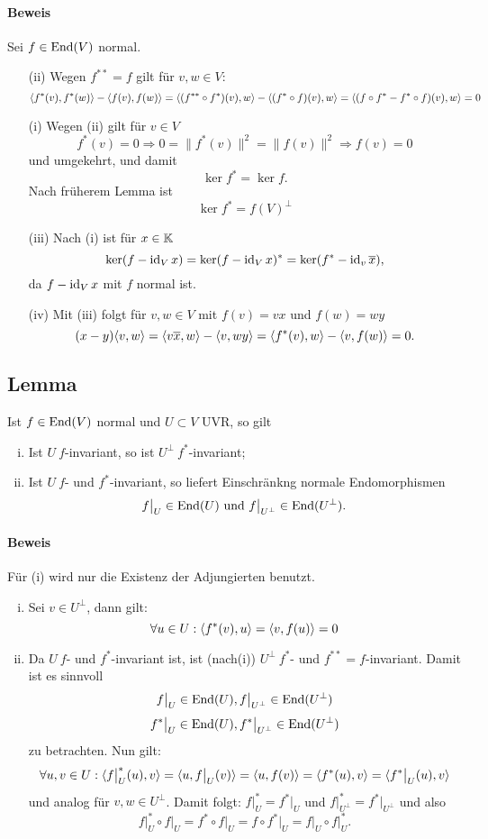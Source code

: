 \paragraph{Beweis}
	Sei $ f\in \operatorname{End}(V) $ normal.
		\begin{enumerate}
			\item[(ii)] Wegen $ f^{**} = f $ gilt für $ v,w\in V $:
				\[ \langle f^*(v),f^*(w) \rangle-\langle f(v),f(w) \rangle = \langle (f^{**}\circ f^*)(v),w \rangle-\langle (f^*\circ f)(v),w \rangle = \langle (f\circ f^*-f^*\circ f)(v),w \rangle = 0 \]
			\item[(i)] Wegen (ii) gilt für $ v\in V $
				\[ f^*(v) = 0 \Rightarrow 0 = \|f^*(v)\|^2 = \|f(v)\|^2\Rightarrow f(v) = 0 \]
				und umgekehrt, und damit
				\[ \ker f^* = \ker f. \]
				Nach früherem Lemma ist
					\[ \ker f^* = f(V)^\perp \]
			\item[(iii)] Nach (i) ist für $ x\in \mathbb{K} $
				\[ \ker(f-\operatorname{id}_Vx) = \ker(f-\operatorname{id}_Vx)^* = \ker(f^*-\operatorname{id}_v\overline{x}), \]
				da $ f-\operatorname{id}_Vx $ mit $ f $ normal ist.
			\item[(iv)] Mit (iii) folgt für $ v,w\in V $ mit $ f(v) = vx $ und $ f(w) = wy $	\[ (x-y)\langle v,w \rangle=\langle v\overline{x},w \rangle-\langle v,wy \rangle = \langle f^*(v),w \rangle-\langle v,f(w) \rangle = 0. \] 
		\end{enumerate}

\subsection{Lemma}
\begin{Lemma}[]
	Ist $ f\in \operatorname{End}(V) $ normal und $ U\subset V $ UVR, so gilt
		\begin{enumerate}[(i)]
			\item Ist $ U\ f $-invariant, so ist $ U^\perp\ f^* $-invariant;
			\item Ist $ U\ f $- und $ f^* $-invariant, so liefert Einschränkng normale Endomorphismen
				\[ f\big|_U \in \operatorname{End}(U) \text{ und } f\big|_{U^\perp}\in \operatorname{End}(U^\perp). \]
		\end{enumerate}
\end{Lemma}
\paragraph{Beweis}
	Für (i) wird nur die Existenz der Adjungierten benutzt.
		\begin{enumerate}[(i)]
			\item Sei $ v\in U^\perp $, dann gilt:
				\[ \forall u\in U: \langle f^*(v),u \rangle = \langle v,f(u) \rangle = 0 \]
			\item Da $ U\ f $- und $ f^* $-invariant ist, ist (nach(i)) $ U^\perp\ f^*$- und $ f^{**} = f $-invariant.		
			Damit ist es sinnvoll
				\[ f\big|_U \in \operatorname{End}(U), f\big|_{U^\perp}\in \operatorname{End}(U^\perp) \]
				\[ f^*\big|_U\in \operatorname{End}(U), f^*\big|_{U^\perp}\in \operatorname{End}(U^\perp) \]
			zu betrachten. Nun gilt:
				\[ \forall u,v\in U: \langle f\big|_U^*(u),v \rangle = \langle u,f\big|_U(v) \rangle = \langle u,f(v) \rangle = \langle f^*(u),v \rangle = \langle f^*\big|_U(u),v \rangle \]
			und analog für $ v,w\in U^\perp $. Damit folgt: $ f\big|_U^* = f^*\big|_U $ und $ f\big|^*_{U^\perp} = f^*\big|_{U^\perp}$ und also
				\[ f\big|_U^* \circ f\big|_U = f^*\circ f\big|_U = f\circ f^*\big|_U = f\big|_U \circ f\big|_U^*. \]
		\end{enumerate}
